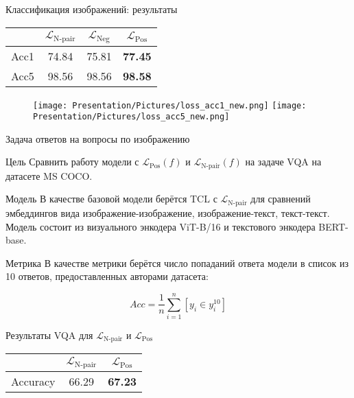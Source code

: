 \documentclass{beamer}
\begin{document}
\begin{frame}{Классификация изображений: результаты}
\begin{table}
\begin{center}
\begin{tabular}{| c | c | c | c |}
\hline
& $\mathcal{L}_{\text{N-pair}}$ & $\mathcal{L}_{\text{Neg}}$ & $\mathcal{L}_{\text{Pos}}$ \\ \hline
Acc1 & 74.84 & 75.81 & \textbf{77.45}\\ \hline
Acc5 & 98.56 & 98.56 & \textbf{98.58}\\ \hline
\end{tabular}
\end{center}
\end{table}

\begin{figure}
   \texttt{[image: Presentation/Pictures/loss\_acc1\_new.png]}
   \hfill
   \texttt{[image: Presentation/Pictures/loss\_acc5\_new.png]}
\end{figure}
\end{frame}
\begin{frame}{Задача ответов на вопросы по изображению}
\scriptsize
\begin{block}{Цель}
Сравнить работу модели с $\mathcal{L}_{\text{Pos}}(f)$ и $\mathcal{L}_{\text{N-pair}}(f)$ на задаче VQA на датасете MS COCO.
\end{block}

\begin{block}{Модель}
В качестве базовой модели берётся TCL с $\mathcal{L}_{\text{N-pair}}$ для сравнений эмбеддингов вида изображение-изображение, изображение-текст, текст-текст. Модель состоит из визуального энкодера  ViT-B/16 и текстового энкодера BERT-base.
\end{block}

\begin{block}{Метрика}
В качестве метрики берётся число попаданий ответа модели в список из 10 ответов, предоставленных авторами датасета:

\[Acc = \frac{1}{n}\sum\limits_{i = 1}^n[y_i \in y_i^{10}]\]
\end{block}

\begin{block}{Результаты VQA для $\mathcal{L}_{\text{N-pair}}$ и $\mathcal{L}_{\text{Pos}}$}
\begin{table}
\begin{center}
\begin{tabular}{| c | c | c |}
\hline
& $\mathcal{L}_{\text{N-pair}}$ & $\mathcal{L}_{\text{Pos}}$ \\ \hline
Accuracy & 66.29 & \textbf{67.23} \\ \hline
\end{tabular}
\label{res_vqa}
\end{center}
\end{table}
\end{block}
\end{frame}
\end{document}
